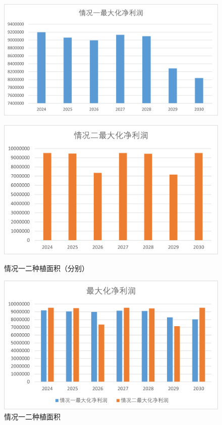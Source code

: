 \documentclass[withoutpreface]{cumcmthesis}
\begin{document}
\begin{figure}[H]
    \centering
    \begin{minipage}{0.49\textwidth}  %
        \centering
        \includegraphics[width=0.9\linewidth]{1.png}  %
        \label{fig:profit_case1_1}
    \end{minipage}\hfill  %
    \begin{minipage}{0.49\textwidth}  %
        \centering
        \includegraphics[width=0.9\linewidth]{2.png}  %
        \label{fig:profit_case1_2}
    \end{minipage}
    \caption{情况一二种植面积（分别）}
\end{figure}

\begin{figure}[H]
    \centering
    \includegraphics[width=.7\textwidth]{3.png}
    \caption{情况一二种植面积}
    \label{fig:profit_case1_1_2}
\end{figure}
\end{document}
